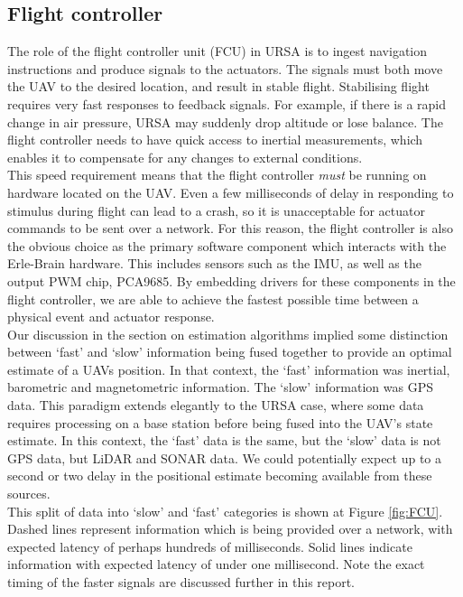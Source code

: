 \documentclass[capstone_report.tex]{subfiles}
\begin{document}
\subsection{Flight controller}
The role of the flight controller unit (FCU) in URSA is to ingest navigation instructions and produce signals to the actuators. The signals must both move the UAV to the desired location, and result in stable flight. Stabilising flight requires very fast responses to feedback signals. For example, if there is a rapid change in air pressure, URSA may suddenly drop altitude or lose balance. The flight controller needs to have quick access to inertial measurements, which enables it to compensate for any changes to external conditions. \\

This speed requirement means that the flight controller \emph{must} be running on hardware located on the UAV. Even a few milliseconds of delay in responding to stimulus during flight can lead to a crash, so it is unacceptable for actuator commands to be sent over a network. For this reason, the flight controller is also the obvious choice as the primary software component which interacts with the Erle-Brain hardware. This includes sensors such as the IMU, as well as the output PWM chip, PCA9685. By embedding drivers for these components in the flight controller, we are able to achieve the fastest possible time between a physical event and actuator response. \\

Our discussion in the section on estimation algorithms implied some distinction between `fast' and `slow' information being fused together to provide an optimal estimate of a UAVs position. In that context, the `fast' information was inertial, barometric and magnetometric information. The `slow' information was GPS data. This paradigm extends elegantly to the URSA case, where some data requires processing on a base station before being fused into the UAV's state estimate. In this context, the `fast' data is the same, but the `slow' data is not GPS data, but LiDAR and SONAR data. We could potentially expect up to a second or two delay in the positional estimate becoming available from these sources. \\

This split of data into `slow' and `fast' categories is shown at Figure \ref{fig:FCU}. Dashed lines represent information which is being provided over a network, with expected latency of perhaps hundreds of milliseconds. Solid lines indicate information with expected latency of under one millisecond. Note the exact timing of the faster signals are discussed further in this report.\\
\end{document}
